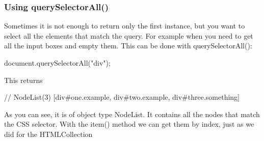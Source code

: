\documentclass{report}
\begin{document}
\begin{jscode}
\subsubsection{Using querySelectorAll()}
\bigbreak \noindent 
Sometimes it is not enough to return only the first instance, but you want to select all
the elements that match the query. For example when you need to get all the input
boxes and empty them. This can be done with querySelectorAll():
\bigbreak \noindent 
\begin{jscode}
document.querySelectorAll("div");
\end{jscode}
\bigbreak \noindent 
This returns
\bigbreak \noindent 
\begin{jscode}
// NodeList(3) [div#one.example, div#two.example, div#three.something]
\end{jscode}
\bigbreak \noindent 
As you can see, it is of object type NodeList. It contains all the nodes that match the
CSS selector. With the item() method we can get them by index, just as we did for
the HTMLCollection

\bigbreak \noindent 

\end{jscode}
\end{document}
